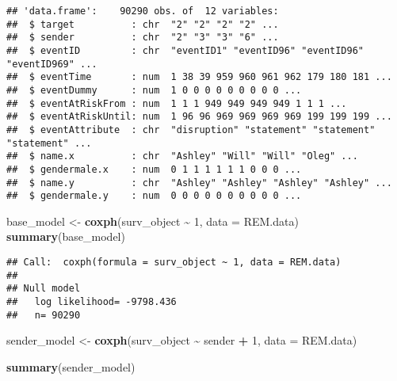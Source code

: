 \documentclass[
]{article}
\newenvironment{Shaded}{\begin{snugshade}}{\end{snugshade}}
\newcommand{\AttributeTok}[1]{\textcolor[rgb]{0.13,0.29,0.53}{#1}}
\newcommand{\DecValTok}[1]{\textcolor[rgb]{0.00,0.00,0.81}{#1}}
\newcommand{\FunctionTok}[1]{\textcolor[rgb]{0.13,0.29,0.53}{\textbf{#1}}}
\newcommand{\NormalTok}[1]{#1}
\newcommand{\OtherTok}[1]{\textcolor[rgb]{0.56,0.35,0.01}{#1}}
\newcommand{\SpecialCharTok}[1]{\textcolor[rgb]{0.81,0.36,0.00}{\textbf{#1}}}
\begin{document}
\begin{verbatim}
## 'data.frame':    90290 obs. of  12 variables:
##  $ target          : chr  "2" "2" "2" "2" ...
##  $ sender          : chr  "2" "3" "3" "6" ...
##  $ eventID         : chr  "eventID1" "eventID96" "eventID96" "eventID969" ...
##  $ eventTime       : num  1 38 39 959 960 961 962 179 180 181 ...
##  $ eventDummy      : num  1 0 0 0 0 0 0 0 0 0 ...
##  $ eventAtRiskFrom : num  1 1 1 949 949 949 949 1 1 1 ...
##  $ eventAtRiskUntil: num  1 96 96 969 969 969 969 199 199 199 ...
##  $ eventAttribute  : chr  "disruption" "statement" "statement" "statement" ...
##  $ name.x          : chr  "Ashley" "Will" "Will" "Oleg" ...
##  $ gendermale.x    : num  0 1 1 1 1 1 1 0 0 0 ...
##  $ name.y          : chr  "Ashley" "Ashley" "Ashley" "Ashley" ...
##  $ gendermale.y    : num  0 0 0 0 0 0 0 0 0 0 ...
\end{verbatim}

\begin{Shaded}
\end{Shaded}

\begin{Shaded}
\begin{Highlighting}[]
\NormalTok{base\_model }\OtherTok{\textless{}{-}} \FunctionTok{coxph}\NormalTok{(surv\_object }\SpecialCharTok{\textasciitilde{}} \DecValTok{1}\NormalTok{, }\AttributeTok{data =}\NormalTok{ REM.data)}
\FunctionTok{summary}\NormalTok{(base\_model)}
\end{Highlighting}
\end{Shaded}

\begin{verbatim}
## Call:  coxph(formula = surv_object ~ 1, data = REM.data)
## 
## Null model
##   log likelihood= -9798.436 
##   n= 90290
\end{verbatim}

\begin{Shaded}
\begin{Highlighting}[]
\NormalTok{sender\_model }\OtherTok{\textless{}{-}} \FunctionTok{coxph}\NormalTok{(surv\_object }\SpecialCharTok{\textasciitilde{}}\NormalTok{ sender }\SpecialCharTok{+} \DecValTok{1}\NormalTok{, }\AttributeTok{data =}\NormalTok{ REM.data)}


\FunctionTok{summary}\NormalTok{(sender\_model)}
\end{Highlighting}
\end{Shaded}
\end{document}
